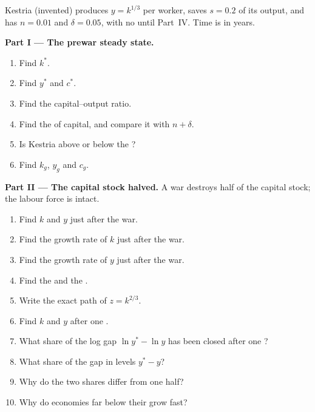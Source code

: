 \begin{problem}\label{pb:b1:solow-model:kestria}
Kestria (invented) produces $y = k^{1/3}$ per worker, saves $s = 0.2$ of its
output, and has $n = 0.01$ and $\delta = 0.05$, with no  until
Part~IV. Time is in years.

\medskip\noindent\textbf{Part I --- The prewar steady state.}
\begin{enumerate}
  \item Find $k^*$.
  \item Find $y^*$ and $c^*$.
  \item Find the capital--output ratio.
  \item Find the  of capital, and compare it with $n + \delta$.
  \item Is Kestria above or below the ?
  \item Find $k_g$, $y_g$ and $c_g$.
\end{enumerate}

\medskip\noindent\textbf{Part II --- The capital stock halved.} A war destroys
half of the capital stock; the labour force is intact.
\begin{enumerate}[resume]
  \item Find $k$ and $y$ just after the war.
  \item Find the growth rate of $k$ just after the war.
  \item Find the growth rate of $y$ just after the war.
  \item Find the  and the .
  \item Write the exact path of $z = k^{2/3}$.
  \item Find $k$ and $y$ after one .
  \item What share of the log gap $\ln y^* - \ln y$ has been closed after one ?
  \item What share of the gap in levels $y^* - y$?
  \item Why do the two shares differ from one half?
  \item Why do economies far below their  grow fast?
\end{enumerate}


\end{problem}
